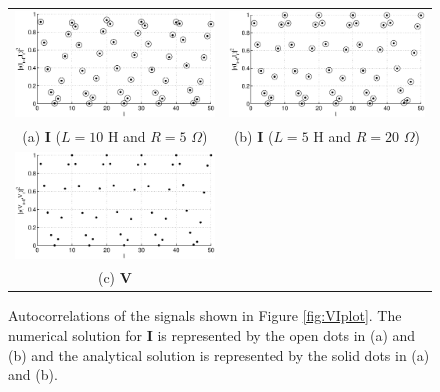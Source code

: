 \begin{figure}[ht]
\begin{center}
\begin{tabular}{cc}
\includegraphics[scale=0.48]{IRCircuitResponseExampleL10R5_autocorrY.eps} &
\includegraphics[scale=0.48]{IRCircuitResponseExampleL5R20_autocorrY.eps} \\
(a) $\mathbf{I}$ ($L=10$ H and $R=5$ $\Omega$) & (b) $\mathbf{I}$ ($L=5$ H and $R=20$ $\Omega$)\\
\includegraphics[scale=0.48]{IRCircuitResponseExampleL10R5_autocorrX.eps} \\
(c) $\mathbf{V}$
\end{tabular}
\end{center}
\caption{Autocorrelations of the signals shown in Figure \ref{fig:VIplot}.  The numerical solution for $\mathbf{I}$ is represented by the open dots in (a) and (b) and the analytical solution is represented by the solid dots in (a) and (b).}
\label{fig:VIautocorr}
\end{figure}
